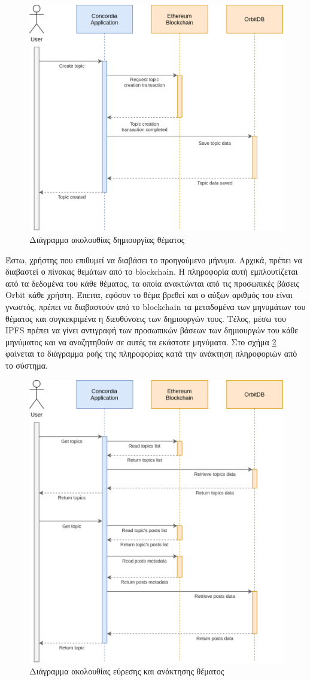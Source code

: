 \begin{figure}[H]
    \centering
    \includegraphics[width=.7\textwidth]{assets/figures/chapter-4/4.4.architecture-4.4.9.data-flow-insert.png}
    \caption{Διάγραμμα ακολουθίας δημιουργίας θέματος}
    \label{figure:4-4-data-flow-insert}
\end{figure}

Έστω, χρήστης που επιθυμεί να διαβάσει το προηγούμενο μήνυμα. Αρχικά, πρέπει να διαβαστεί ο πίνακας θεμάτων από το blockchain. Η πληροφορία αυτή εμπλουτίζεται από τα δεδομένα του κάθε θέματος, τα οποία ανακτώνται από τις προσωπικές βάσεις Orbit κάθε χρήστη. Έπειτα, εφόσον το θέμα βρεθεί και ο αύξων αριθμός του είναι γνωστός, πρέπει να διαβαστούν από το blockchain τα μεταδομένα των μηνυμάτων του θέματος και συγκεκριμένα η διευθύνσεις των δημιουργών τους. Τέλος, μέσω του IPFS πρέπει να γίνει αντιγραφή των προσωπικών βάσεων των δημιουργών του κάθε μηνύματος και να αναζητηθούν σε αυτές τα εκάστοτε μηνύματα. Στο σχήμα \ref{figure:4-4-data-flow-read} φαίνεται το διάγραμμα ροής της πληροφορίας κατά την ανάκτηση πληροφοριών από το σύστημα.

\begin{figure}[H]
    \centering
    \includegraphics[width=.7\textwidth]{assets/figures/chapter-4/4.4.architecture-4.4.9.data-flow-read.png}
    \caption{Διάγραμμα ακολουθίας εύρεσης και ανάκτησης θέματος}
    \label{figure:4-4-data-flow-read}
\end{figure}
